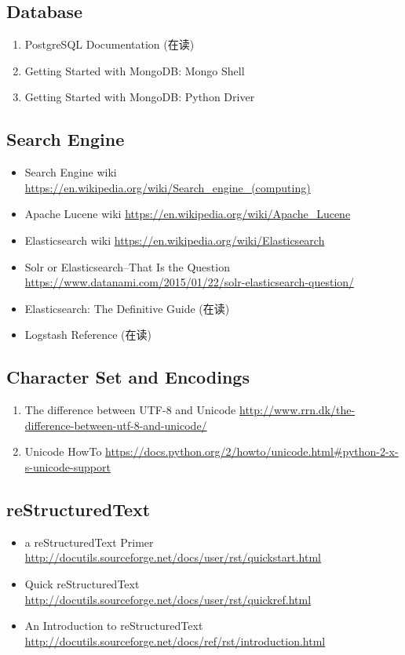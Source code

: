 \documentclass{article}
\begin{document}
\subsection{Database}
\begin{enumerate}
    \item PostgreSQL Documentation (在读)
    \item Getting Started with MongoDB: Mongo Shell
    \item Getting Started with MongoDB: Python Driver
\end{enumerate}
%
\subsection{Search Engine}
%
\begin{itemize}
    \item Search Engine wiki \url{https://en.wikipedia.org/wiki/Search_engine_(computing)}
    \item Apache Lucene wiki \url{https://en.wikipedia.org/wiki/Apache_Lucene}
    \item Elasticsearch wiki \url{https://en.wikipedia.org/wiki/Elasticsearch}
    \item Solr or Elasticsearch–That Is the Question \url{https://www.datanami.com/2015/01/22/solr-elasticsearch-question/}
    \item Elasticsearch: The Definitive Guide (在读)
    \item Logstash Reference (在读)
\end{itemize}
\subsection{Character Set and Encodings}
\begin{enumerate}
    \item The difference between UTF-8 and Unicode \url{http://www.rrn.dk/the-difference-between-utf-8-and-unicode/}
    \item Unicode HowTo \url{https://docs.python.org/2/howto/unicode.html#python-2-x-s-unicode-support}
\end{enumerate}
%
\subsection{reStructuredText}
\begin{itemize}
    \item a reStructuredText Primer \url{http://docutils.sourceforge.net/docs/user/rst/quickstart.html}
    \item Quick reStructuredText \url{http://docutils.sourceforge.net/docs/user/rst/quickref.html}
    \item An Introduction to reStructuredText \url{http://docutils.sourceforge.net/docs/ref/rst/introduction.html}
\end{itemize}
%
\end{document}
